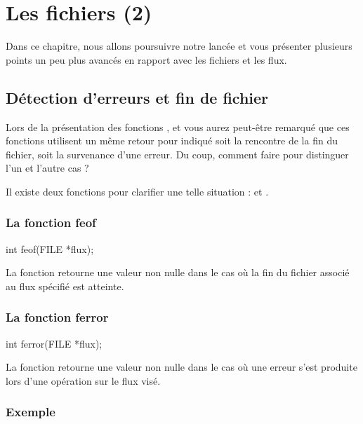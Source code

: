 \chapter{Les fichiers (2)}
\label{les-fichiers-(2)}

Dans ce chapitre, nous allons poursuivre notre lancée et vous présenter
plusieurs points un peu plus avancés en rapport avec les fichiers et les
flux.

\section{Détection d'erreurs et fin de fichier}
\label{detection-derreurs-et-fin-de-fichier}

Lors de la présentation des fonctions
,  et  vous aurez
peut-être remarqué que ces fonctions utilisent un même retour pour
indiqué soit la rencontre de la fin du fichier, soit la survenance d'une
erreur. Du coup, comment faire pour distinguer l'un et l'autre cas ?

Il existe deux fonctions pour clarifier une telle situation :
 et .

\subsection{La fonction feof}
\label{la-fonction-feof}

\begin{C}
int feof(FILE *flux);
\end{C}

La fonction  retourne une valeur non nulle dans le cas où
la fin du fichier associé au flux spécifié est atteinte.

\subsection{La fonction ferror}
\label{la-fonction-ferror}

\begin{C}
int ferror(FILE *flux);
\end{C}

La fonction  retourne une valeur non nulle dans le cas
où une erreur s'est produite lors d'une opération sur le flux visé.

\subsection{Exemple}
\label{exemple-13}

